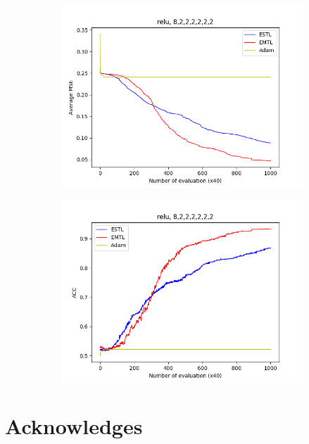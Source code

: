 \documentclass[conference]{IEEEtran}
\theoremstyle{definition}
\begin{document}
\begin{figure}
      \begin{subfigure}{0.48\linewidth}
        \centering
        \includegraphics[width=1.0\linewidth]{images/relu/avg_mse8,2,2,2,2,2,2.png}
      \end{subfigure}
      \begin{subfigure}{0.48\linewidth}
        \centering
        \includegraphics[width=1.0\linewidth]{images/relu/avg_acc8,2,2,2,2,2,2.png}
      \end{subfigure}
    \end{figure}

\section{Acknowledges}
  \cite{mfea-ffnn} \cite{mfea}

\printbibliography
\end{document}
